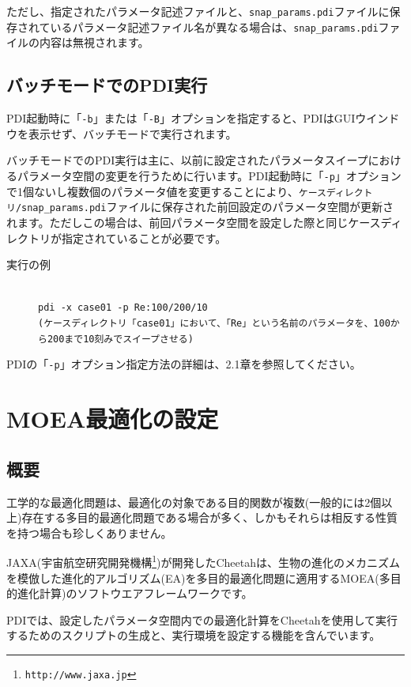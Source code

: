 \documentclass[a4paper,11pt]{jarticle}
\begin{document}
{ただし、指定されたパラメータ記述ファイルと、{\tt snap\_params.pdi}ファイルに保存されているパラメータ記述ファイル名が異なる場合は、{\tt snap\_params.pdi}ファイルの内容は無視されます。


\subsection{バッチモードでのPDI実行}

PDI起動時に「{\tt -b}」または「{\tt -B}」オプションを指定すると、PDIはGUIウインドウを表示せず、バッチモードで実行されます。

バッチモードでのPDI実行は主に、以前に設定されたパラメータスイープにおけるパラメータ空間の変更を行うために行います。PDI起動時に「{\tt -p}」オプションで1個ないし複数個のパラメータ値を変更することにより、{\tt ケースディレクトリ/snap\_params.pdi}ファイルに保存された前回設定のパラメータ空間が更新されます。ただしこの場合は、前回パラメータ空間を設定した際と同じケースディレクトリが指定されていることが必要です。

\begin{description}
\item[実行の例] {\ }\\
{\tt pdi  -x case01  -p Re:100/200/10}\\
{\tt (ケースディレクトリ「case01」において、「Re」という名前のパラメータを、100から200まで10刻みでスイープさせる)}
\end{description}

PDIの「{\tt -p}」オプション指定方法の詳細は、2.1章を参照してください。

\newpage
\section{MOEA最適化の設定}

\subsection{概要}

工学的な最適化問題は、最適化の対象である目的関数が複数(一般的には2個以上)存在する多目的最適化問題である場合が多く、しかもそれらは相反する性質を持つ場合も珍しくありません。

JAXA(宇宙航空研究開発機構\footnote{\tt http://www.jaxa.jp})が開発したCheetahは、生物の進化のメカニズムを模倣した進化的アルゴリズム(EA)を多目的最適化問題に適用するMOEA(多目的進化計算)のソフトウエアフレームワークです。

PDIでは、設定したパラメータ空間内での最適化計算をCheetahを使用して実行するためのスクリプトの生成と、実行環境を設定する機能を含んでいます。

}
\end{document}

